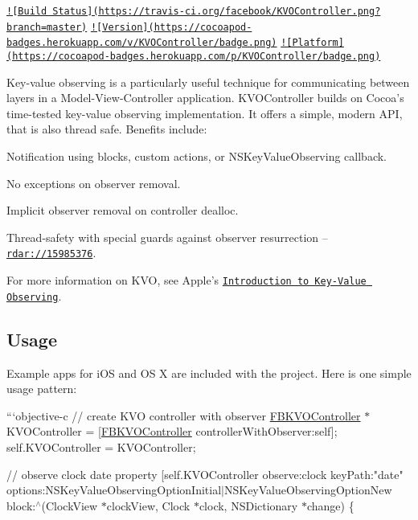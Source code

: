 \href{https://travis-ci.org/facebook/KVOController}{\tt !\mbox{[}Build Status\mbox{]}(https\+://travis-\/ci.\+org/facebook/\+K\+V\+O\+Controller.\+png?branch=master)} \href{http://cocoadocs.org/docsets/KVOController}{\tt !\mbox{[}Version\mbox{]}(https\+://cocoapod-\/badges.\+herokuapp.\+com/v/\+K\+V\+O\+Controller/badge.\+png)} \href{http://cocoadocs.org/docsets/KVOController}{\tt !\mbox{[}Platform\mbox{]}(https\+://cocoapod-\/badges.\+herokuapp.\+com/p/\+K\+V\+O\+Controller/badge.\+png)}

Key-\/value observing is a particularly useful technique for communicating between layers in a Model-\/\+View-\/\+Controller application. K\+V\+O\+Controller builds on Cocoa's time-\/tested key-\/value observing implementation. It offers a simple, modern A\+P\+I, that is also thread safe. Benefits include\+:


\begin{DoxyItemize}
\item Notification using blocks, custom actions, or N\+S\+Key\+Value\+Observing callback.
\item No exceptions on observer removal.
\item Implicit observer removal on controller dealloc.
\item Thread-\/safety with special guards against observer resurrection – \href{http://openradar.appspot.com/radar?id=5305010728468480}{\tt rdar\+://15985376}.
\end{DoxyItemize}

For more information on K\+V\+O, see Apple's \href{https://developer.apple.com/library/mac/documentation/Cocoa/Conceptual/KeyValueObserving/KeyValueObserving.html}{\tt Introduction to Key-\/\+Value Observing}.

\subsection*{Usage}

Example apps for i\+O\+S and O\+S X are included with the project. Here is one simple usage pattern\+:

```objective-\/c // create K\+V\+O controller with observer \hyperlink{interface_f_b_k_v_o_controller}{F\+B\+K\+V\+O\+Controller} $\ast$\+K\+V\+O\+Controller = \mbox{[}\hyperlink{interface_f_b_k_v_o_controller}{F\+B\+K\+V\+O\+Controller} controller\+With\+Observer\+:self\mbox{]}; self.\+K\+V\+O\+Controller = K\+V\+O\+Controller;

// observe clock date property \mbox{[}self.\+K\+V\+O\+Controller observe\+:clock key\+Path\+:"date" options\+:N\+S\+Key\+Value\+Observing\+Option\+Initial$\vert$\+N\+S\+Key\+Value\+Observing\+Option\+New block\+:$^\wedge$(Clock\+View $\ast$clock\+View, Clock $\ast$clock, N\+S\+Dictionary $\ast$change) \{

